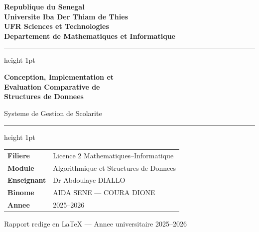 \documentclass[12pt,a4paper]{article}
\begin{document}
\begin{titlepage}
    \centering
    \vspace*{1cm}

    {\large\bfseries\color{bleu}
    Republique du Senegal \\
    Universite Iba Der Thiam de Thies \\
    UFR Sciences et Technologies \\
    Departement de Mathematiques et Informatique}

    \vspace{1.5cm}
    \hrule height 1pt
    \vspace{0.5cm}

    {\Huge\bfseries\color{bleu}
    Conception, Implementation et \\[0.3cm]
    Evaluation Comparative de \\[0.3cm]
    Structures de Donnees}

    \vspace{0.4cm}
    {\large\color{vert}
    Systeme de Gestion de Scolarite}

    \vspace{0.5cm}
    \hrule height 1pt
    \vspace{1.5cm}

    {\large
    \begin{tabular}{ll}
        \textbf{Filiere}     & Licence 2 Mathematiques--Informatique \\[6pt]
        \textbf{Module}      & Algorithmique et Structures de Donnees \\[6pt]
        \textbf{Enseignant}  & Dr Abdoulaye DIALLO \\[6pt]
        \textbf{Binome}      & AIDA SENE --- COURA DIONE \\[6pt]
        \textbf{Annee}       & 2025--2026 \\
    \end{tabular}}

    \vfill
    {\small\color{gray} Rapport redige en \LaTeX{} --- Annee universitaire 2025--2026}
\end{titlepage}

\tableofcontents
\newpage
\end{document}
